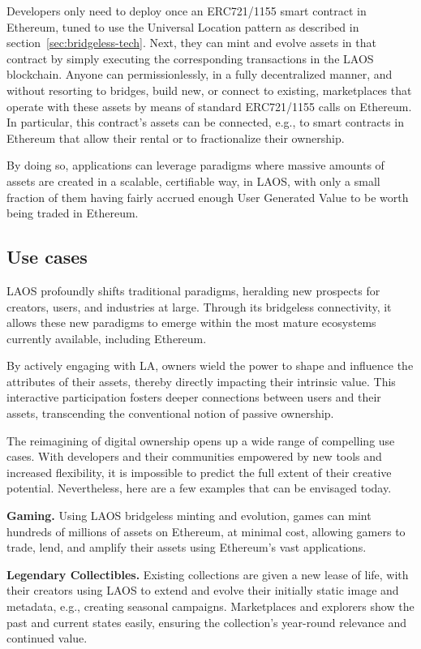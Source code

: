 Developers only need to deploy once
an ERC721/1155 smart contract in Ethereum,
tuned to use the Universal Location pattern as described
in section \ref{sec:bridgeless-tech}. Next, they can mint and evolve
assets in that contract by simply executing the corresponding transactions in the 
LAOS blockchain. Anyone can permissionlessly, in a fully decentralized manner,
and without resorting to bridges, build new, or connect to existing,
marketplaces that operate with these assets by means of standard
ERC721/1155 calls on Ethereum.
In particular, this contract's assets can be connected, e.g., to smart contracts
in Ethereum that allow their rental or to fractionalize their ownership.

By doing so, applications can leverage paradigms where massive amounts
of assets are created in a scalable, certifiable way, in LAOS, with only
a small fraction of them having fairly accrued enough User Generated Value 
to be worth being traded in Ethereum.


\subsection{Use cases}\label{sec:use cases}

LAOS profoundly shifts traditional paradigms,
heralding new prospects for creators, users,
and industries at large.
Through its bridgeless connectivity,
it allows these new paradigms to emerge
within the most mature ecosystems currently available, including Ethereum.

By actively engaging with LA, owners wield the power
to shape and influence the attributes of their assets,
thereby directly impacting their intrinsic value.
This interactive participation fosters deeper connections between
users and their assets, transcending the conventional
notion of passive ownership.

The reimagining of digital ownership opens up
a wide range of compelling use cases.
With developers and their communities empowered by
new tools and increased flexibility,
it is impossible to predict the full extent of their
creative potential. Nevertheless, here are a few examples
that can be envisaged today.

{\bf Gaming.} Using LAOS bridgeless minting and evolution,
games can mint hundreds of millions of assets on Ethereum,
at minimal cost, allowing gamers to trade,
lend, and amplify their assets using Ethereum's vast applications. 

{\bf Legendary Collectibles.} Existing collections are given a
new lease of life, with their creators using LAOS to extend and evolve their initially static
image and metadata, e.g., creating seasonal campaigns.
Marketplaces and explorers show the past and current states easily,
ensuring the collection's year-round relevance and continued value.

